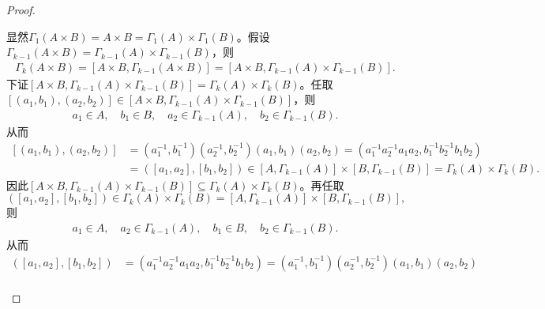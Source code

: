\documentclass[../../main.tex]{subfiles}%
\begin{document}
\begin{proof}
\begin{enumerate}[(1)]
显然$\Gamma _1\left( A\times B \right) =A\times B=\Gamma _1\left( A \right) \times \Gamma _1\left( B \right)$。假设$\Gamma _{k-1}\left( A\times B \right) =\Gamma _{k-1}\left( A \right) \times \Gamma _{k-1}\left( B \right)$，则
\begin{align}
\Gamma _k\left( A\times B \right) =\left[ A\times B,\Gamma _{k-1}\left( A\times B \right) \right] =\left[ A\times B,\Gamma _{k-1}\left( A \right) \times \Gamma _{k-1}\left( B \right) \right].\label{eq:::--q89h2dfwfzznmnghmghkhlyujf21.1}
\end{align}
下证$\left[ A\times B,\Gamma _{k-1}\left( A \right) \times \Gamma _{k-1}\left( B \right) \right] =\Gamma _k\left( A \right) \times \Gamma _k\left( B \right)$。任取$\left[ \left( a_1,b_1 \right) ,\left( a_2,b_2 \right) \right] \in \left[ A\times B,\Gamma _{k-1}\left( A \right) \times \Gamma _{k-1}\left( B \right) \right]$，则
\begin{align*}
a_1\in A,\quad b_1\in B,\quad a_2\in \Gamma _{k-1}\left( A \right),\quad b_2\in \Gamma _{k-1}\left( B \right).
\end{align*}
从而
\begin{align*}
\left[ \left( a_1,b_1 \right) ,\left( a_2,b_2 \right) \right] &=\left( a_{1}^{-1},b_{1}^{-1} \right) \left( a_{2}^{-1},b_{2}^{-1} \right) \left( a_1,b_1 \right) \left( a_2,b_2 \right) =\left( a_{1}^{-1}a_{2}^{-1}a_1a_2,b_{1}^{-1}b_{2}^{-1}b_1b_2 \right) \\
&=\left( \left[ a_1,a_2 \right] ,\left[ b_1,b_2 \right] \right) \in \left[ A,\Gamma _{k-1}\left( A \right) \right] \times \left[ B,\Gamma _{k-1}\left( B \right) \right] =\Gamma _k\left( A \right) \times \Gamma _k\left( B \right).
\end{align*}
因此$\left[ A\times B,\Gamma _{k-1}\left( A \right) \times \Gamma _{k-1}\left( B \right) \right] \subseteq \Gamma _k\left( A \right) \times \Gamma _k\left( B \right)$。再任取$$\left( \left[ a_1,a_2 \right] ,\left[ b_1,b_2 \right] \right) \in \Gamma _k\left( A \right) \times \Gamma _k\left( B \right)=\left[ A,\Gamma _{k-1}\left( A \right) \right] \times \left[ B,\Gamma _{k-1}\left( B \right) \right],$$
则
\begin{align*}
a_1\in A,\quad a_2\in \Gamma _{k-1}\left( A \right),\quad b_1\in B,\quad b_2\in \Gamma _{k-1}\left( B \right).
\end{align*}
从而
\begin{align*}
\left( \left[ a_1,a_2 \right] ,\left[ b_1,b_2 \right] \right) &=\left( a_{1}^{-1}a_{2}^{-1}a_1a_2,b_{1}^{-1}b_{2}^{-1}b_1b_2 \right) =\left( a_{1}^{-1},b_{1}^{-1} \right) \left( a_{2}^{-1},b_{2}^{-1} \right) \left( a_1,b_1 \right) \left( a_2,b_2 \right) \\

\end{align*}
\end{enumerate}
\end{proof}
\end{document}
